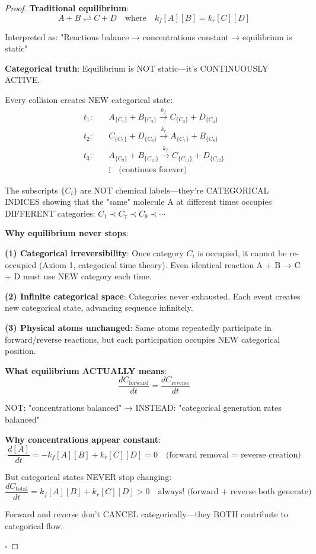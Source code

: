 \documentclass[12pt,a4paper]{article}
\begin{document}
\begin{proof}
\textbf{Traditional equilibrium}:
\begin{equation}
A + B \rightleftharpoons C + D \quad \text{where} \quad k_f[A][B] = k_r[C][D]
\end{equation}

Interpreted as: "Reactions balance → concentrations constant → equilibrium is static"

\textbf{Categorical truth}: Equilibrium is NOT static—it's CONTINUOUSLY ACTIVE.

Every collision creates NEW categorical state:
\begin{align}
t_1: \quad &A_{\{C_1\}} + B_{\{C_2\}} \xrightarrow{k_f} C_{\{C_3\}} + D_{\{C_4\}} \\
t_2: \quad &C_{\{C_5\}} + D_{\{C_6\}} \xrightarrow{k_r} A_{\{C_7\}} + B_{\{C_8\}} \\
t_3: \quad &A_{\{C_9\}} + B_{\{C_{10}\}} \xrightarrow{k_f} C_{\{C_{11}\}} + D_{\{C_{12}\}} \\
&\vdots \quad \text{(continues forever)}
\end{align}

The subscripts $\{C_i\}$ are NOT chemical labels—they're CATEGORICAL INDICES showing that the "same" molecule A at different times occupies DIFFERENT categories: $C_1 \prec C_7 \prec C_9 \prec \cdots$

\textbf{Why equilibrium never stops}:

\textbf{(1) Categorical irreversibility}: Once category $C_i$ is occupied, it cannot be re-occupied (Axiom 1, categorical time theory). Even identical reaction A + B → C + D must use NEW category each time.

\textbf{(2) Infinite categorical space}: Categories never exhausted. Each event creates new categorical state, advancing sequence infinitely.

\textbf{(3) Physical atoms unchanged}: Same atoms repeatedly participate in forward/reverse reactions, but each participation occupies NEW categorical position.

\textbf{What equilibrium ACTUALLY means}:
\begin{equation}
\boxed{\frac{dC_{\text{forward}}}{dt} = \frac{dC_{\text{reverse}}}{dt}}
\end{equation}

NOT: "concentrations balanced" → INSTEAD: "categorical generation rates balanced"

\textbf{Why concentrations appear constant}:
\begin{equation}
\frac{d[A]}{dt} = -k_f[A][B] + k_r[C][D] = 0 \quad \text{(forward removal = reverse creation)}
\end{equation}

But categorical states NEVER stop changing:
\begin{equation}
\frac{dC_{\text{total}}}{dt} = k_f[A][B] + k_r[C][D] > 0 \quad \text{always! (forward + reverse both generate)}
\end{equation}

Forward and reverse don't CANCEL categorically—they BOTH contribute to categorical flow.

$\square$
\end{proof}
\end{document}

